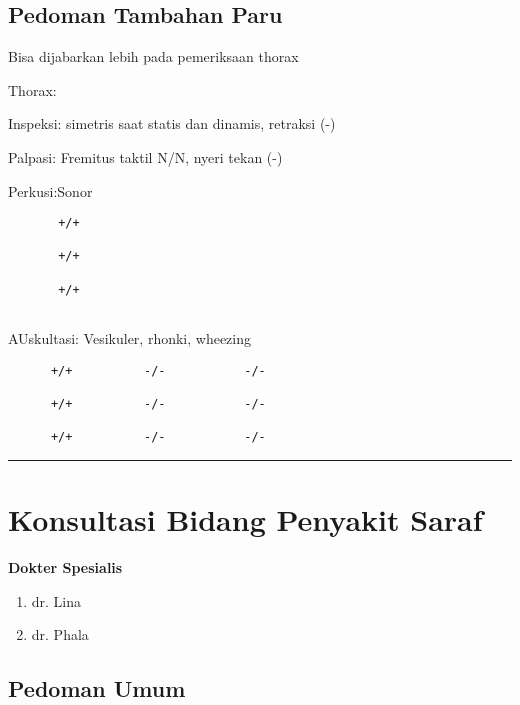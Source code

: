 \documentclass[
]{book}
\providecommand{\tightlist}{%
  \setlength{\itemsep}{0pt}\setlength{\parskip}{0pt}}
\begin{document}
\hypertarget{pedoman-tambahan-paru}{%
\subsection{Pedoman Tambahan Paru}\label{pedoman-tambahan-paru}}

Bisa dijabarkan lebih pada pemeriksaan thorax

Thorax:

Inspeksi: simetris saat statis dan dinamis, retraksi (-)

Palpasi: Fremitus taktil N/N, nyeri tekan (-)

Perkusi:Sonor

\begin{verbatim}
       +/+
         
       +/+
             
       +/+
             
\end{verbatim}

AUskultasi: Vesikuler, rhonki, wheezing

\begin{verbatim}
      +/+          -/-           -/-
                    
      +/+          -/-           -/-
      
      +/+          -/-           -/-
\end{verbatim}

\begin{center}\rule{0.5\linewidth}{0.5pt}\end{center}

\hypertarget{konsultasi-bidang-penyakit-saraf}{%
\section{Konsultasi Bidang Penyakit Saraf}\label{konsultasi-bidang-penyakit-saraf}}

\textbf{Dokter Spesialis}

\begin{enumerate}
\def\labelenumi{\arabic{enumi}.}
\tightlist
\item
  dr. Lina
\item
  dr. Phala
\end{enumerate}

\hypertarget{pedoman-umum}{%
\subsection{Pedoman Umum}\label{pedoman-umum}}
\end{document}
